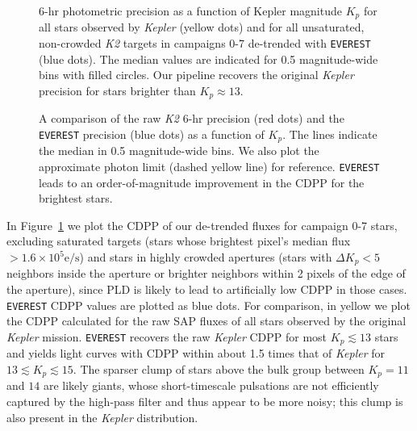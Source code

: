 \documentclass[]{emulateapj}
\begin{document}
\label{sec:precision}
\begin{figure}[h]
  \begin{center}
       \caption{6-hr photometric precision as a function of Kepler magnitude $K_p$
                for all stars observed by \emph{Kepler} 
                (yellow dots) and for all unsaturated, non-crowded \emph{K2} targets
                in campaigns 0-7 de-trended with \texttt{EVEREST}
                (blue dots). The median values are indicated
                for 0.5 magnitude-wide bins with filled circles.
                Our pipeline recovers the original \emph{Kepler} precision for stars
                brighter than $K_p \approx 13$.}
     \label{fig:precision1}
  \end{center}
\end{figure}
\begin{figure}[h]
  \begin{center}
       \caption{A comparison of the raw \emph{K2} 6-hr precision (red dots) and the \texttt{EVEREST} 
       precision (blue dots) as a function of $K_p$. The lines
       indicate the median in 0.5 magnitude-wide bins. We also plot the approximate photon
       limit (dashed yellow line) for reference. \texttt{EVEREST} leads to an order-of-magnitude
       improvement in the CDPP for the brightest stars.}
     \label{fig:precision2}
  \end{center}
\end{figure}

In Figure~\ref{fig:precision1} we plot the CDPP of our de-trended fluxes for campaign 0-7 
stars, excluding saturated targets (stars whose brightest pixel's median flux $> 1.6\times 10^5 \mathrm{e/s}$) 
and stars in highly crowded apertures (stars with $\Delta K_p < 5$ neighbors
inside the aperture or brighter neighbors within 2 pixels of the edge of the aperture),
since PLD is likely to lead to artificially low CDPP in those cases. \texttt{EVEREST}
CDPP values are plotted as blue dots. For comparison, in yellow we plot the CDPP calculated for the raw
SAP fluxes of all stars observed by the original \emph{Kepler} mission. 
\texttt{EVEREST} recovers the raw \emph{Kepler} CDPP for most $K_p \lesssim 13$ stars
and yields light curves with CDPP within about 1.5 times that of \emph{Kepler}
for $13 \lesssim K_p \lesssim 15$. The sparser clump of stars above the bulk group between
$K_p = 11$ and $14$ are likely giants, whose short-timescale pulsations are not efficiently
captured by the high-pass filter and thus appear to be more noisy; this clump is also
present in the \emph{Kepler} distribution.
\end{document}
